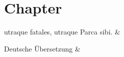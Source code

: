 \documentclass{scrbook}
\begin{document}
\chapter{Chapter}
\begin{pages}
\begin{Leftside}
    \beginnumbering
    \stanza
    utraque fatales, utraque Parca sibi.
    \&
    \endnumbering
\end{Leftside}
\begin{Rightside}
    \beginnumbering
    \stanza
    Deutsche Übersetzung
    \&
    \endnumbering
\end{Rightside}
\Pages
\end{pages} 
\end{document}
